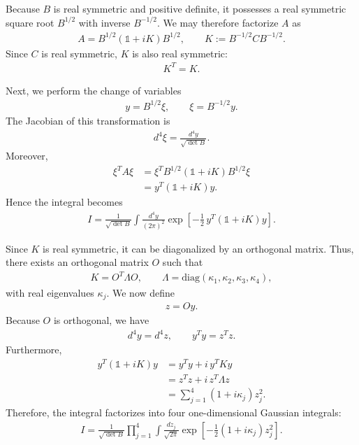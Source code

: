 \documentclass[%
 reprint,
 amsmath,amssymb,
 aps,
twocolumn
]{revtex4-2}
\begin{document}
Because $B$ is real symmetric and positive definite, it possesses a real symmetric square root $B^{1/2}$ with inverse $B^{-1/2}$. We may therefore factorize $A$ as
\begin{align}
A
=
B^{1/2}\left(\mathbb{1}+iK\right)B^{1/2},
\qquad
K:=B^{-1/2}CB^{-1/2}.
\end{align}
Since $C$ is real symmetric, $K$ is also real symmetric:
\begin{align}
K^T=K.
\end{align}

Next, we perform the change of variables
\begin{align}
y=B^{1/2}\xi,
\qquad
\xi=B^{-1/2}y.
\end{align}
The Jacobian of this transformation is
\begin{align}
d^4\xi=\frac{d^4y}{\sqrt{\det B}}.
\end{align}
Moreover,
\begin{align}
\xi^T A\xi
&=\xi^T B^{1/2}\left(\mathbb{1}+iK\right)B^{1/2}\xi\\
&=y^T\left(\mathbb{1}+iK\right)y.
\end{align}
Hence the integral becomes
\begin{align}
I
=
\frac{1}{\sqrt{\det B}}
\int \frac{d^4y}{(2\pi)^2}
\exp\!\left[
-\frac12\,y^T\left(\mathbb{1}+iK\right)y
\right].
\end{align}

Since $K$ is real symmetric, it can be diagonalized by an orthogonal matrix. Thus, there exists\cite{axler2024linear} an orthogonal matrix $O$ such that
\begin{align}
K=O^T\Lambda O,
\qquad
\Lambda=\mathrm{diag}(\kappa_1,\kappa_2,\kappa_3,\kappa_4),
\end{align}
with real eigenvalues $\kappa_j$. We now define
\begin{align}
z=Oy.
\end{align}
Because $O$ is orthogonal, we have
\begin{align}
d^4y=d^4z,
\qquad
y^Ty=z^Tz.
\end{align}
Furthermore,
\begin{align}
y^T\left(\mathbb{1}+iK\right)y
&=
y^Ty+i\,y^TKy\\
&=
z^Tz+i\,z^T\Lambda z\\
&=
\sum_{j=1}^4 (1+i\kappa_j)z_j^2.
\end{align}
Therefore, the integral factorizes into four one-dimensional Gaussian integrals:
\begin{align}
I
=
\frac{1}{\sqrt{\det B}}
\prod_{j=1}^4
\int \frac{dz_j}{\sqrt{2\pi}}
\exp\!\left[
-\frac12(1+i\kappa_j)z_j^2
\right].
\end{align}
\end{document}
